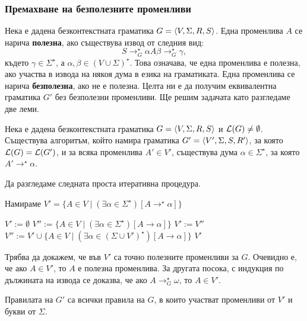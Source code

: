 \subsubsection*{Премахване на безполезните променливи}

Нека е дадена безконтекстната граматика $G = \langle{V,\Sigma,R,S}\rangle$.
Една променлива $A$ се нарича {\bf полезна}, ако съществува извод от следния вид:
\[S \to^\star_G \alpha A \beta \to^\star_G \gamma,\]
където $\gamma \in \Sigma^\star$, а $\alpha,\beta \in (V \cup \Sigma)^\star$.
Това означава, че една променлива е полезна, ако участва в извода на някоя дума в езика на граматиката.
Една променлива се нарича {\bf безполезна}, ако не е полезна.
Целта ни е да получим еквивалентна граматика $G'$ без безполезни променливи.
Ще решим задачата като разгледаме две леми.

\begin{lemma}
  \label{lem:useless1}
  Нека е дадена безконтекстната граматика $G = \langle{V,\Sigma,R,S}\rangle$ и $\mathcal{L}(G) \neq \emptyset$.
  Съществува алгоритъм, който намира граматика $G' = \langle{V',\Sigma,S,R'}\rangle$, за която 
  $\mathcal{L}(G) = \mathcal{L}(G')$, и за всяка променлива $A' \in V'$, съществува дума $\alpha \in \Sigma^\star$,
  за която $A' \to^\star \alpha$.
\end{lemma}
\begin{hint}
  Да разгледаме следната проста итеративна процедура.
  \begin{algorithm}[H]
    \caption{Намираме $V' = \{A \in V\mid (\exists \alpha \in \Sigma^\star)[A \to^\star \alpha]\}$}
    \label{alg:useless}
    \begin{algorithmic}[1]
      \State $V' := \emptyset$
      \State $V'' := \{A \in V \mid (\exists \alpha \in \Sigma^\star)[A \to \alpha]\}$
      \State $V' := V''$
      \State $V'' := V' \cup \{A \in V \mid (\exists \alpha \in (\Sigma \cup V')^\star)[A \to \alpha]\}$
      \EndWhile
      \State \Return $V'$
    \end{algorithmic}
  \end{algorithm}
  Трябва да докажем, че във $V'$ са точно полезните променливи за $G$.
  Очевидно е, че ако $A \in V'$, то $A$ е полезна променлива.
  За другата посока, с индукция по дължината на извода се доказва, че ако $A \to^\star_G \omega$,
  то $A \in V'$.
  
  Правилата на $G'$ са всички правила на $G$, в които участват променливи от $V'$ и букви от $\Sigma$.
\end{hint}


